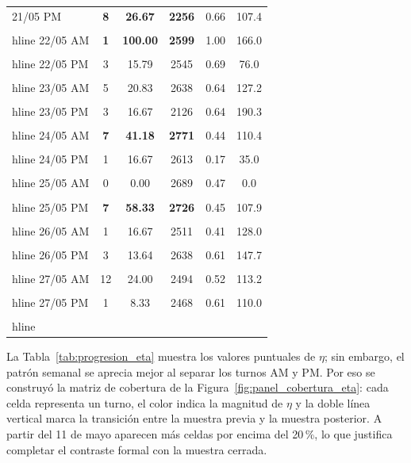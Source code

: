 \begin{table}[H]
\begin{tabular}{|l|c|c|c|c|c|}
\rowcolor{ThesisGreen!8} 21/05 PM & \textbf{8} & \textbf{26.67} & \textbf{2256} & 0.66 & 107.4 \\ \\hline
\rowcolor{ThesisGreen!8} 22/05 AM & \textbf{1} & \textbf{100.00} & \textbf{2599} & 1.00 & 166.0 \\ \\hline
\rowcolor{ThesisGreen!8} 22/05 PM & 3 & 15.79 & 2545 & 0.69 & 76.0 \\ \\hline
\rowcolor{ThesisGreen!8} 23/05 AM & 5 & 20.83 & 2638 & 0.64 & 127.2 \\ \\hline
\rowcolor{ThesisGreen!8} 23/05 PM & 3 & 16.67 & 2126 & 0.64 & 190.3 \\ \\hline
\rowcolor{ThesisGreen!8} 24/05 AM & \textbf{7} & \textbf{41.18} & \textbf{2771} & 0.44 & 110.4 \\ \\hline
\rowcolor{ThesisGreen!8} 24/05 PM & 1 & 16.67 & 2613 & 0.17 & 35.0 \\ \\hline
\rowcolor{ThesisGreen!8} 25/05 AM & 0 & 0.00 & 2689 & 0.47 & 0.0 \\ \\hline
\rowcolor{ThesisGreen!8} 25/05 PM & \textbf{7} & \textbf{58.33} & \textbf{2726} & 0.45 & 107.9 \\ \\hline
\rowcolor{ThesisGreen!8} 26/05 AM & 1 & 16.67 & 2511 & 0.41 & 128.0 \\ \\hline
\rowcolor{ThesisGreen!8} 26/05 PM & 3 & 13.64 & 2638 & 0.61 & 147.7 \\ \\hline
\rowcolor{ThesisGreen!8} 27/05 AM & 12 & 24.00 & 2494 & 0.52 & 113.2 \\ \\hline
\rowcolor{ThesisGreen!8} 27/05 PM & 1 & 8.33 & 2468 & 0.61 & 110.0 \\ \\hline
\end{tabular}
\end{table}

La Tabla~\ref{tab:progresion_eta} muestra los valores puntuales de $\eta$; sin embargo, el patrón semanal se aprecia mejor al separar los turnos AM y PM. Por eso se construyó la matriz de cobertura de la Figura~\ref{fig:panel_cobertura_eta}: cada celda representa un turno, el color indica la magnitud de $\eta$ y la doble línea vertical marca la transición entre la muestra previa y la muestra posterior. A partir del 11 de mayo aparecen más celdas por encima del 20\,\%, lo que justifica completar el contraste formal con la muestra cerrada.

